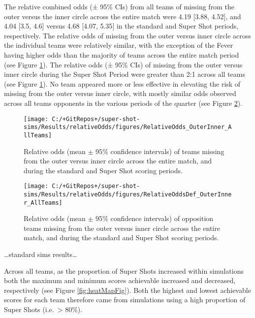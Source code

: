 \documentclass[]{elsarticle} %
\begin{document}
The relative combined odds (± 95\% CIs) from all teams of missing from
the outer versus the inner circle across the entire match were 4.19
{[}3.88, 4.52{]}, and 4.04 {[}3.5, 4.6{]} versus 4.68 {[}4.07, 5.35{]}
in the standard and Super Shot periods, respectively. The relative odds
of missing from the outer versus inner circle across the individual
teams were relatively similar, with the exception of the Fever having
higher odds than the majority of teams across the entire match period
(see Figure \ref{fig:relativeOddsFig}). The relative odds (± 95\% CIs)
of missing from the outer versus inner circle during the Super Shot
Period were greater than 2:1 across all teams (see Figure
\ref{fig:relativeOddsFig}). No team appeared more or less effective in
elevating the risk of missing from the outer versus inner circle, with
mostly similar odds observed across all teams opponents in the various
periods of the quarter (see Figure \ref{fig:relativeOddsDefFig}).

\begin{figure}

{\centering \texttt{[image: C:/+GitRepos+/super-shot-sims/Results/relativeOdds/figures/RelativeOdds\_OuterInner\_AllTeams]} 

}

\caption{Relative odds (mean $\pm$ 95$\%$ confidence intervals) of teams missing from the outer versus inner circle across the entire match, and during the standard and Super Shot scoring periods.}\label{fig:relativeOddsFig}
\end{figure}

\begin{figure}

{\centering \texttt{[image: C:/+GitRepos+/super-shot-sims/Results/relativeOdds/figures/RelativeOddsDef\_OuterInner\_AllTeams]} 

}

\caption{Relative odds (mean $\pm$ 95$\%$ confidence intervals) of opposition teams missing from the outer versus inner circle across the entire match, and during the standard and Super Shot scoring periods.}\label{fig:relativeOddsDefFig}
\end{figure}

\ldots standard sims results\ldots{}

Across all teams, as the proportion of Super Shots increased within
simulations both the maximum and minimum scores achievable increased and
decreased, respectively (see Figure \ref{fig:heatMapFig}). Both the
highest and lowest achievable scores for each team therefore came from
simulations using a high proportion of Super Shots (i.e.~\textgreater{}
80\%).
\end{document}
